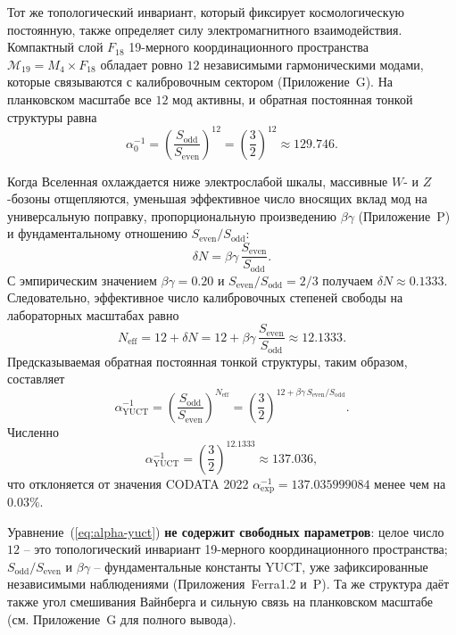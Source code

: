 \documentclass[11pt,a4paper]{article}
\begin{document}
	Тот же топологический инвариант, который фиксирует космологическую постоянную, также определяет
	силу электромагнитного взаимодействия.  Компактный слой \(F_{18}\)
	19-мерного координационного пространства \(\mathcal{M}_{19}=M_4\times F_{18}\) обладает
	ровно \(12\) независимыми гармоническими модами, которые связываются с калибровочным сектором
	(Приложение~G).  На планковском масштабе все \(12\) мод активны, и обратная
	постоянная тонкой структуры равна
	\begin{equation}
		\alpha_0^{-1} = \left(\frac{S_{\mathrm{odd}}}{S_{\mathrm{even}}}\right)^{12}
		= \left(\frac{3}{2}\right)^{12} \approx 129.746 .
	\end{equation}
	
	Когда Вселенная охлаждается ниже электрослабой шкалы, массивные \(W\)- и \(Z\)-бозоны отщепляются, уменьшая эффективное число вносящих вклад мод на универсальную
	поправку, пропорциональную произведению \(\beta\gamma\) (Приложение~P) и
	фундаментальному отношению \(S_{\mathrm{even}}/S_{\mathrm{odd}}\):
	\begin{equation}
		\delta N = \beta\gamma \, \frac{S_{\mathrm{even}}}{S_{\mathrm{odd}}} .
	\end{equation}
	С эмпирическим значением \(\beta\gamma = 0.20\) и \(S_{\mathrm{even}}/S_{\mathrm{odd}} = 2/3\)
	получаем \(\delta N \approx 0.1333\).  Следовательно, эффективное число калибровочных
	степеней свободы на лабораторных масштабах равно
	\begin{equation}
		N_{\mathrm{eff}} = 12 + \delta N = 12 + \beta\gamma\,\frac{S_{\mathrm{even}}}{S_{\mathrm{odd}}}
		\approx 12.1333 .
	\end{equation}
	Предсказываемая обратная постоянная тонкой структуры, таким образом, составляет
	\begin{equation}
		\boxed{\alpha^{-1}_{\mathrm{YUCT}} =
			\left(\frac{S_{\mathrm{odd}}}{S_{\mathrm{even}}}\right)^{N_{\mathrm{eff}}}
			= \left(\frac{3}{2}\right)^{12 + \beta\gamma\,S_{\mathrm{even}}/S_{\mathrm{odd}}} } .
		\label{eq:alpha-yuct}
	\end{equation}
	Численно
	\[
	\alpha^{-1}_{\mathrm{YUCT}} = \left(\frac{3}{2}\right)^{12.1333} \approx 137.036 ,
	\]
	что отклоняется от значения CODATA 2022 \(\alpha^{-1}_{\mathrm{exp}} = 137.035999084\)
	менее чем на \(0.03\%\).
	
	Уравнение~(\ref{eq:alpha-yuct}) \textbf{не содержит свободных параметров}: целое число
	\(12\) – это топологический инвариант 19-мерного координационного пространства;
	\(S_{\mathrm{odd}}/S_{\mathrm{even}}\) и \(\beta\gamma\) – фундаментальные константы
	YUCT, уже зафиксированные независимыми наблюдениями (Приложения~Ferra1.2 и~P).
	Та же структура даёт также угол смешивания Вайнберга и сильную связь на
	планковском масштабе (см. Приложение~G для полного вывода).
	
\end{document}
